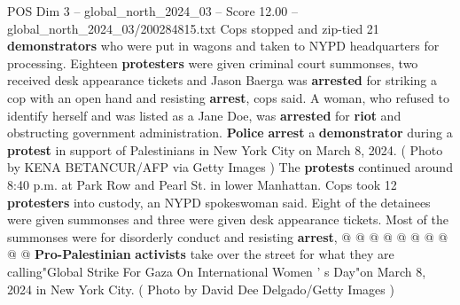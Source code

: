 \begin{textsample}{POS Dim 3 – global\_north\_2024\_03 – Score 12.00 – global\_north\_2024\_03/200284815.txt}
Cops stopped and zip-tied 21 \textbf{demonstrators} who were put in wagons and taken to NYPD headquarters for processing.
Eighteen \textbf{protesters} were given criminal court summonses, two received desk appearance tickets and Jason Baerga was \textbf{arrested} for striking a cop with an open hand and resisting \textbf{arrest}, cops said.
A woman, who refused to identify herself and was listed as a Jane Doe, was \textbf{arrested} for \textbf{riot} and obstructing government administration. \textbf{Police} \textbf{arrest} a \textbf{demonstrator} during a \textbf{protest} in support of Palestinians in New York City on March 8, 2024. ( Photo by KENA BETANCUR/AFP via Getty Images ) The \textbf{protests} continued around 8:40 p.m. at Park Row and Pearl St. in lower Manhattan.
Cops took 12 \textbf{protesters} into custody, an NYPD spokeswoman said.
Eight of the detainees were given summonses and three were given desk appearance tickets.
Most of the summonses were for disorderly conduct and resisting \textbf{arrest}, @ @ @ @ @ @ @ @ @ @ \textbf{Pro-Palestinian} \textbf{activists} take over the street for what they are calling"Global Strike For Gaza On International Women ' s Day"on March 8, 2024 in New York City. ( Photo by David Dee Delgado/Getty Images )

\end{textsample}
